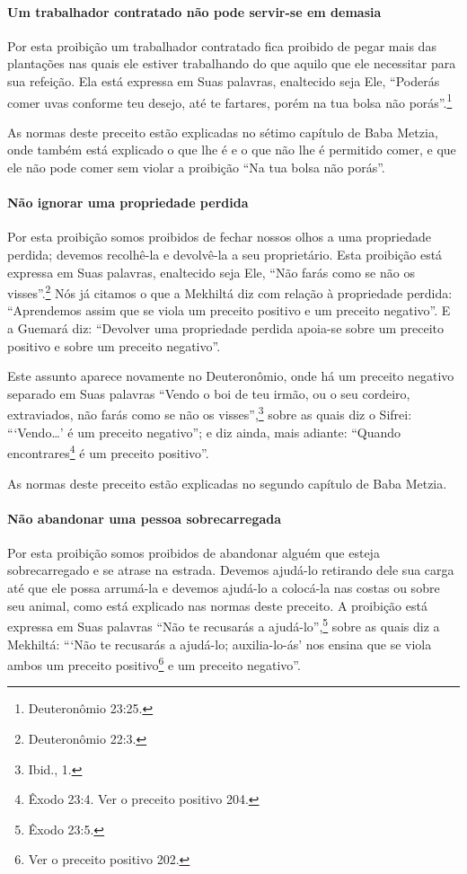 \paragraph{Um trabalhador contratado não pode servir-se em demasia}

Por esta proibição um trabalhador contratado fica proibido de pegar
mais das plantações nas quais ele estiver trabalhando do que aquilo que
ele necessitar para sua refeição. Ela está expressa em Suas palavras,
enaltecido seja Ele, ``Poderás comer uvas conforme teu desejo, até te
fartares, porém na tua bolsa não porás''.\footnote{Deuteronômio 23:25.}

As normas deste preceito estão explicadas no sétimo capítulo de Baba
Metzia, onde também está explicado o que lhe é e o que não lhe é
permitido comer, e que ele não pode comer sem violar a proibição ``Na
tua bolsa não porás''.

\paragraph{Não ignorar uma propriedade perdida}

Por esta proibição somos proibidos de fechar nossos olhos a uma
propriedade perdida; devemos recolhê-la e devolvê-la a seu proprietário.
Esta proibição está expressa em Suas palavras, enaltecido seja Ele, ``Não
farás como se não os visses''.\footnote{Deuteronômio 22:3.} Nós já citamos o que
a Mekhiltá diz com relação à propriedade perdida: ``Aprendemos assim que
se viola um preceito positivo e um preceito negativo''. E a Guemará diz:
``Devolver uma propriedade perdida apoia-se sobre um preceito positivo e
sobre um preceito negativo''.

Este assunto aparece novamente no Deuteronômio, onde há um preceito
negativo separado em Suas palavras ``Vendo o boi de teu irmão, ou o seu
cordeiro, extraviados, não farás como se não os visses'',\footnote{Ibid., 1.}
sobre as quais diz o Sifrei: ```Vendo\ldots{}' é um preceito negativo''; e
diz ainda, mais adiante: ``Quando encontrares\footnote{Êxodo
23:4. Ver o preceito positivo 204.} é um preceito positivo''.

As normas deste preceito estão explicadas no segundo capítulo de Baba Metzia.

\paragraph{Não abandonar uma pessoa sobrecarregada}

Por esta proibição somos proibidos de abandonar alguém que esteja
sobrecarregado e se atrase na estrada. Devemos ajudá-lo retirando dele
sua carga até que ele possa arrumá-la e devemos ajudá-lo a colocá-la nas
costas ou sobre seu animal, como está explicado nas normas deste
preceito. A proibição está expressa em Suas palavras ``Não te recusarás
a ajudá-lo'',\footnote{Êxodo 23:5.} sobre as quais diz a Mekhiltá: ```Não te recusarás a ajudá-lo;
auxilia-lo-ás' nos ensina que se viola ambos um preceito
positivo\footnote{Ver o preceito positivo 202.} e um preceito negativo''.

